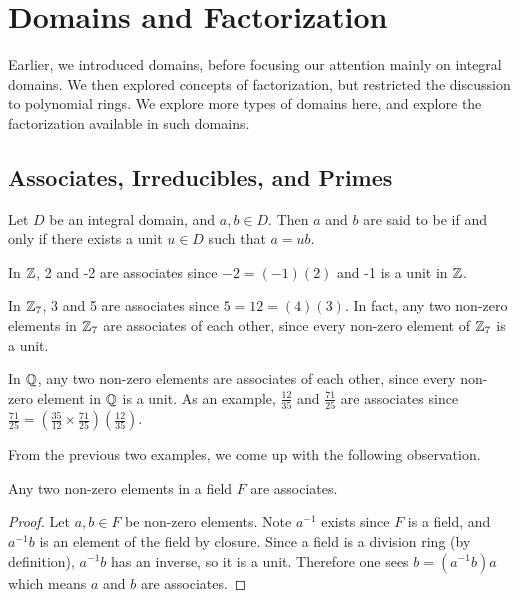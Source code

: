 \chapter{Domains and Factorization}
Earlier, we introduced domains, before focusing our attention mainly on integral domains. We then explored concepts of factorization, but restricted the discussion to polynomial rings. We explore more types of domains here, and explore the factorization available in such domains.

\section{Associates, Irreducibles, and Primes}
\begin{definition}
    Let $D$ be an integral domain, and $a,b \in D$. Then $a$ and $b$ are said to be  if and only if there exists a unit $u \in D$ such that $a = ub$.
\end{definition}

\begin{example}
    In $\mathbb{Z}$, 2 and -2 are associates since $-2 = (-1)(2)$ and -1 is a unit in $\mathbb{Z}$.
\end{example}

\begin{example}
    In $\mathbb{Z}_7$, 3 and 5 are associates since $5 = 12 = (4)(3)$. In fact, any two non-zero elements in $\mathbb{Z}_7$ are associates of each other, since every non-zero element of $\mathbb{Z}_7$ is a unit.
\end{example}

\begin{example}
    In $\mathbb{Q}$, any two non-zero elements are associates of each other, since every non-zero element in $\mathbb{Q}$ is a unit. As an example, $\frac{12}{35}$ and $\frac{71}{25}$ are associates since $\frac{71}{25} = \left(\frac{35}{12} \times \frac{71}{25}\right)\left(\frac{12}{35}\right)$.
\end{example}

From the previous two examples, we come up with the following observation.

\begin{proposition}
    Any two non-zero elements in a field $F$ are associates.
\end{proposition}
\begin{proof}
    Let $a, b \in F$ be non-zero elements. Note $a^{-1}$ exists since $F$ is a field, and $a^{-1}b$ is an element of the field by closure. Since a field is a division ring (by definition), $a^{-1}b$ has an inverse, so it is a unit. Therefore one sees $b = (a^{-1}b)a$ which means $a$ and $b$ are associates.
\end{proof}

